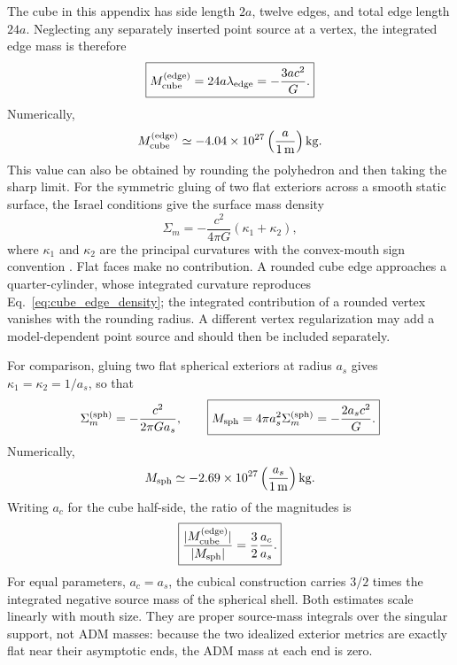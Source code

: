 \documentclass[journal,a4paper]{IEEEtran}
\begin{document}
The cube in this appendix has side length \(2a\), twelve edges, and total
edge length \(24a\).  Neglecting any separately inserted point source at a
vertex, the integrated edge mass is therefore
\begin{equation}
    \boxed{
    M_{\rm cube}^{\rm(edge)}
    =24a\lambda_{\rm edge}
    =-\frac{3ac^2}{G}.
    }
    \label{eq:cube_source_mass}
\end{equation}
Numerically,
\begin{equation}
    M_{\rm cube}^{\rm(edge)}
    \simeq
    -4.04\times10^{27}
    \left(\frac{a}{1\,\mathrm{m}}\right)\mathrm{kg}.
\end{equation}
This value can also be obtained by rounding the polyhedron and then taking
the sharp limit.  For the symmetric gluing of two flat exteriors across a
smooth static surface, the Israel conditions give the surface mass density
\begin{equation}
    \Sigma_m
    =-\frac{c^2}{4\pi G}(\kappa_1+\kappa_2),
    \label{eq:flat_gluing_surface_density}
\end{equation}
where \(\kappa_1\) and \(\kappa_2\) are the principal curvatures with the
convex-mouth sign convention \cite{Israel1966,PoissonToolkit,PoissonVisser1995}.
Flat faces make no contribution.  A rounded cube edge approaches a
quarter-cylinder, whose integrated curvature reproduces
Eq.~\eqref{eq:cube_edge_density}; the integrated contribution of a rounded
vertex vanishes with the rounding radius.  A different vertex
regularization may add a model-dependent point source and should then be
included separately.

For comparison, gluing two flat spherical exteriors at radius \(a_s\) gives
\(\kappa_1=\kappa_2=1/a_s\), so that
\begin{equation}
    \Sigma_m^{\rm(sph)}=-\frac{c^2}{2\pi G a_s},
    \qquad
    \boxed{
    M_{\rm sph}
    =4\pi a_s^2\Sigma_m^{\rm(sph)}
    =-\frac{2a_sc^2}{G}.
    }
    \label{eq:spherical_shell_source_mass}
\end{equation}
Numerically,
\begin{equation}
    M_{\rm sph}
    \simeq
    -2.69\times10^{27}
    \left(\frac{a_s}{1\,\mathrm{m}}\right)\mathrm{kg}.
\end{equation}
Writing \(a_c\) for the cube half-side, the ratio of the magnitudes is
\begin{equation}
    \boxed{
    \frac{|M_{\rm cube}^{\rm(edge)}|}{|M_{\rm sph}|}
    =\frac{3}{2}\frac{a_c}{a_s}.
    }
    \label{eq:cube_sphere_mass_ratio}
\end{equation}
For equal parameters, \(a_c=a_s\), the cubical construction carries
\(3/2\) times the integrated negative source mass of the spherical shell.
Both estimates scale linearly with mouth size.  They are proper source-mass
integrals over the singular support, not ADM masses: because the two
idealized exterior metrics are exactly flat near their asymptotic ends,
the ADM mass at each end is zero.
\end{document}
